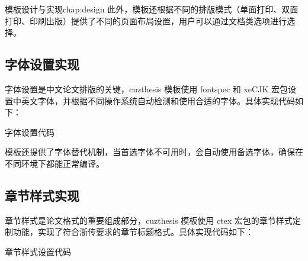 \begin{cuzchapter}{模板设计与实现}{chap:design}
    此外，模板还根据不同的排版模式（单面打印、双面打印、印刷出版）提供了不同的页面布局设置，用户可以通过文档类选项进行选择。
    
    \subsection{字体设置实现}
    
    字体设置是中文论文排版的关键，cuzthesis 模板使用 fontspec 和 xeCJK 宏包设置中英文字体，并根据不同操作系统自动检测和使用合适的字体。具体实现代码如下：
    
    \begin{listing}[htbp]
        \caption{字体设置代码}
        \label{code:font-setting}
        \begin{texcode}
            \setmainfont{Times New Roman}
            \setsansfont{Arial}
            \setmonofont{Courier New}
            
        \end{texcode}
    \end{listing}
    
    模板还提供了字体替代机制，当首选字体不可用时，会自动使用备选字体，确保在不同环境下都能正常编译。
    
    \subsection{章节样式实现}
    
    章节样式是论文格式的重要组成部分，cuzthesis 模板使用 ctex 宏包的章节样式定制功能，实现了符合浙传要求的章节标题格式。具体实现代码如下：
    
    \begin{listing}[htbp]
        \caption{章节样式设置代码}
        \label{code:chapter-style}
        \begin{texcode}
        \end{texcode}
    \end{listing}
    

\end{cuzchapter}
